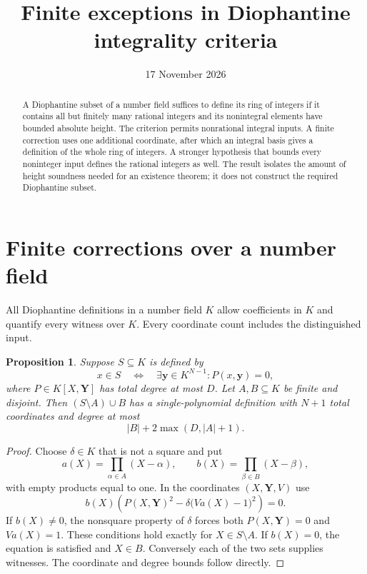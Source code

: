 \documentclass[11pt,a4paper]{article}
\title{Finite exceptions in Diophantine integrality criteria}
\author{}\date{17 November 2026}
\newtheorem{proposition}[theorem]{Proposition}
\begin{document}
\maketitle
\begin{abstract}
A Diophantine subset of a number field suffices to define its ring
of integers if it contains all but finitely many rational integers
and its nonintegral elements have bounded absolute height. The
criterion permits nonrational integral inputs. A finite correction
uses one additional coordinate, after which an integral basis gives
a definition of the whole ring of integers. A stronger hypothesis
that bounds every noninteger input defines the rational integers
as well. The result isolates the amount of height soundness needed
for an existence theorem; it does not construct the required
Diophantine subset.
\end{abstract}

\section{Finite corrections over a number field}
All Diophantine definitions in a number field $K$ allow
coefficients in $K$ and quantify every witness over $K$.
Every coordinate count includes the distinguished input.

\begin{proposition}\label{prop:correction}
Suppose $S\subseteq K$ is defined by
\[
 x\in S\quad\Longleftrightarrow\quad
 \exists\mathbf y\in K^{N-1}: P(x,\mathbf y)=0,
\]
where $P\in K[X,\mathbf Y]$ has total degree at most $D$.
Let $A,B\subseteq K$ be finite and disjoint. Then
$(S\setminus A)\cup B$ has a single-polynomial definition with
$N+1$ total coordinates and degree at most
\[
 |B|+2\max(D,|A|+1).
\]
\end{proposition}
\begin{proof}
Choose $\delta\in K$ that is not a square and put
\[
 a(X)=\prod_{\alpha\in A}(X-\alpha),\qquad
 b(X)=\prod_{\beta\in B}(X-\beta),
\]
with empty products equal to one. In the coordinates
$(X,\mathbf Y,V)$ use
\[
 b(X)\left(P(X,\mathbf Y)^2-
                 \delta\bigl(Va(X)-1\bigr)^2\right)=0.
\]
If $b(X)\ne0$, the nonsquare property of $\delta$ forces both
$P(X,\mathbf Y)=0$ and $Va(X)=1$. These conditions hold exactly
for $X\in S\setminus A$. If $b(X)=0$, the equation is satisfied
and $X\in B$. Conversely each of the two sets supplies witnesses.
The coordinate and degree bounds follow directly.
\end{proof}
\end{document}
